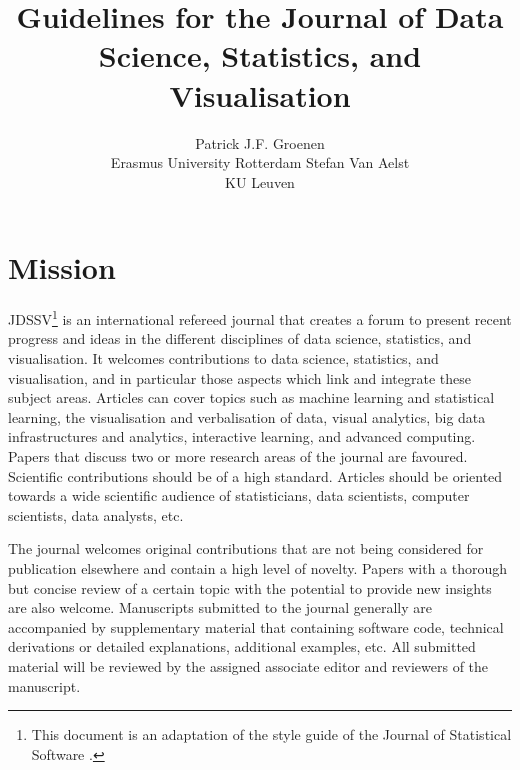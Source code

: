 \documentclass[article]{jdssv}
\author{Patrick J.F. Groenen\\Erasmus University Rotterdam
   \And Stefan Van Aelst\\KU Leuven}
\title{Guidelines for the Journal of Data Science, Statistics, and Visualisation}
\begin{document}




\section{Mission}

JDSSV\footnote{This document is an adaptation of the style guide of the Journal of Statistical Software \citep{jss_style_guide}.} is an international refereed journal that creates a forum to present recent progress and ideas in the different disciplines of data science, statistics, and visualisation. It welcomes contributions to data science, statistics, and visualisation, and in particular those aspects which link and integrate these subject areas. Articles can cover topics such as machine learning and statistical learning, the visualisation and verbalisation of data, visual analytics, big data infrastructures and analytics, interactive learning, and advanced computing. Papers that discuss two or more research areas of the journal are favoured. Scientific contributions should be of a high standard. Articles should be oriented towards a wide scientific audience of statisticians, data scientists, computer scientists, data analysts, etc.

The journal welcomes original contributions that are not being considered for publication elsewhere and contain a high level of novelty. Papers with a thorough but concise review of a certain topic with the potential to provide new insights are also welcome. Manuscripts submitted to the journal generally are accompanied by supplementary material that containing software code, technical derivations or detailed explanations, additional examples, etc. All submitted material will be reviewed by the assigned associate editor and reviewers of the manuscript. 
\end{document}
